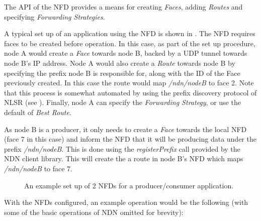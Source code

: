  The API of the NFD provides a means for creating \textit{Faces}, adding \textit{Routes} and specifying \textit{Forwarding Strategies}.
 
 A typical set up of an application using the NFD is shown in . The NFD requires faces to be created before operation. In this case, as part of the set up procedure, node A would create a \textit{Face} towards node B, backed by a UDP tunnel towards node B's IP address. Node A would also create a \textit{Route} towards node B by specifying the prefix node B is responsible for, along with the ID of the Face previously created. In this case the route would map \textit{/ndn/nodeB} to face 2. Note that this process is somewhat automated by using the prefix discovery protocol of NLSR (see ). Finally, node A can specify the \textit{Forwarding Strategy}, or use the default of \textit{Best Route}.


As node B is a producer, it only needs to create a \textit{Face} towards the local NFD (face 7 in this case) and inform the NFD that it will be producing data under the prefix \textit{/ndn/nodeB}. This is done using the  \textit{registerPrefix} call provided by the NDN client library. This will create the a route in node B's NFD which maps \textit{/ndn/nodeB} to face 7.
\begin{figure}[H]
    \centering
    \caption{An example set up of 2 NFDs for a producer/consumer application.}
    \label{fig:nfd-setup}
\end{figure}

With the NFDs configured, an example operation would be the following (with some of the basic operations of NDN omitted for brevity):

